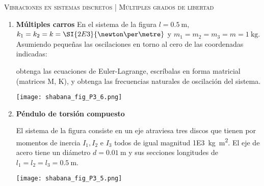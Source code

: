 \documentclass[11pt, spanish, a4paper, twopage]{article}
\begin{document}
\begin{center}
	\textsc{\large Vibraciones en sistemas discretos | Múltiples grados de libertad}
\end{center}


\begin{enumerate}

				
\item 
\begin{minipage}[t][4cm]{0.65\textwidth}
	\textbf{Múltiples carros}
	En el sistema de la figura \(l = \SI{0.5}{\metre}\), \(k_1 = k_2 = k = \SI{2E3}{\newton\per\metre}\) y \(m_1 = m_2 = m_3 = m = \SI{1}{\kilo\gram}\).
	Asumiendo pequeñas las oscilaciones en torno al cero de las coordenadas indicadas:
	\begin{tasks}
		\task obtenga las ecuaciones de Euler-Lagrange,
		\task escríbalas en forma matricial (matrices M, K), y
		\task obtenga las frecuencias naturales de oscilación del sistema.
	\end{tasks}
\end{minipage}
\begin{minipage}[c][0cm][t]{0.3\textwidth}
	\texttt{[image: shabana\_fig\_P3\_6.png]}
\end{minipage}



\item 
\begin{minipage}[t][2.5cm]{0.65\textwidth}
	\textbf{Péndulo de torsión compuesto}

	El sistema de la figura consiste en un eje atraviesa tres discos que tienen por momentos de inercia \(I_1, I_2\) e \(I_3\) todos de igual magnitud \SI{1E3}{\kilo\gram\metre\squared}.
	El eje de acero tiene un diámetro \(d = \SI{0.01}{\metre}\) y sus secciones longitudes de \(l_1 = l_2 = l_3 = \SI{0.5}{\metre}\).
\end{minipage}
\begin{minipage}[c][1cm][t]{0.3\textwidth}
	\texttt{[image: shabana\_fig\_P3\_5.png]}
\end{minipage}



\end{enumerate}
\end{document}

